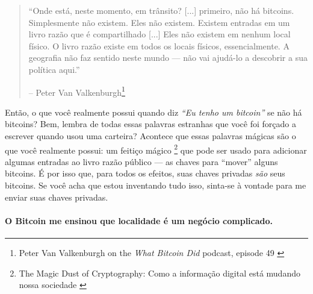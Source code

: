 \begin{quotation}\begin{samepage}
\enquote{Onde está, neste momento, em trânsito? [...] primeiro, não há bitcoins. Simplesmente não existem. Eles não existem. Existem entradas em um livro razão que é compartilhado [...] Eles não existem em nenhum local físico. O livro razão existe em todos os locais físicos, essencialmente. A geografia não faz sentido neste mundo --- não vai ajudá-lo a descobrir a sua política aqui.}
\begin{flushright} -- Peter Van Valkenburgh\footnote{Peter Van Valkenburgh on the \textit{What Bitcoin Did} podcast, episode 49 \cite{wbd049}}
\end{flushright}\end{samepage}\end{quotation}

Então, o que você realmente possui quando diz \textit{\enquote{Eu tenho um bitcoin}} se não há bitcoins? Bem, lembra de todas essas palavras estranhas que você foi forçado a escrever quando usou uma carteira? Acontece que essas palavras mágicas são o que você realmente possui: um feitiço mágico \footnote{The Magic Dust of Cryptography: Como a informação digital está mudando nossa sociedade \cite{gigi:magic-spell}} que pode ser usado para adicionar algumas entradas ao livro razão público --- as chaves para \enquote{mover} alguns bitcoins. É por isso que, para todos os efeitos, suas chaves privadas \textit{são} seus bitcoins. Se você acha que estou inventando tudo isso, sinta-se à vontade para me enviar suas chaves privadas.

\paragraph{O Bitcoin me ensinou que localidade é um negócio complicado.}

%
%
%
%
%
%
%
